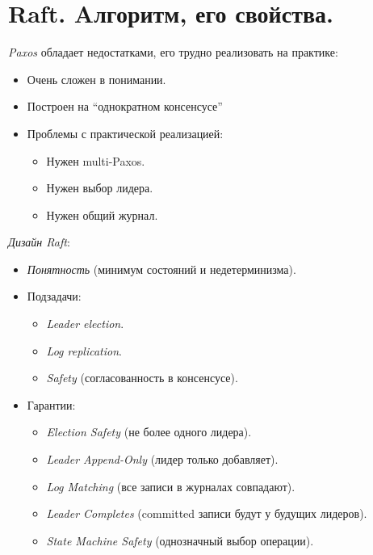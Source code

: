 \section{Raft. Aлгоритм, его свойства.}

\begin{remark}
    \textit{Paxos} обладает недостатками,
    его трудно реализовать на практике:
    \begin{itemize}
        \item Очень сложен в понимании.
        \item Построен на ``однократном консенсусе''
        \item Проблемы с практической реализацией:
            \begin{itemize}
                \item Нужен multi-Paxos.
                \item Нужен выбор лидера.
                \item Нужен общий журнал.
            \end{itemize}
    \end{itemize}
\end{remark}

\begin{definition} \textit{Дизайн Raft}:
    \begin{itemize}
        \item \textit{Понятность} (минимум состояний и недетерминизма).
        \item Подзадачи:
            \begin{itemize}
                \item \textit{Leader election}.
                \item \textit{Log replication}.
                \item \textit{Safety} (согласованность в консенсусе).
            \end{itemize}
        \item Гарантии:
            \begin{itemize}
                \item \textit{Election Safety} (не более одного лидера).
                \item \textit{Leader Append-Only} (лидер только добавляет).
                \item \textit{Log Matching} (все записи в журналах совпадают).
                \item \textit{Leader Completes} (committed записи будут у будущих лидеров).
                \item \textit{State Machine Safety} (однозначный выбор операции).
            \end{itemize}
    \end{itemize}
\end{definition}

